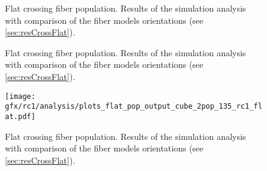 %
\begin{figure}[!p]
\centering
{}
\caption{Flat crossing fiber population. Results of the simulation analysis with comparison of the fiber models orientations (see \cref{sec:resCrossFlat}).}
\label{app:flat_fiber_pop_c}
\end{figure}
%
\begin{figure}[!p]
\centering
{}
\caption{Flat crossing fiber population. Results of the simulation analysis with comparison of the fiber models orientations (see \cref{sec:resCrossFlat}).}
\label{app:flat_fiber_pop_d}
\end{figure}
%
\begin{figure}[!p]
\centering
\texttt{[image: gfx/rc1/analysis/plots\_flat\_pop\_output\_cube\_2pop\_135\_rc1\_flat.pdf]}
\caption{Flat crossing fiber population. Results of the simulation analysis with comparison of the fiber models orientations (see \cref{sec:resCrossFlat}).}
\label{app:flat_fiber_pop_e}
\end{figure}
%
%
%
%
